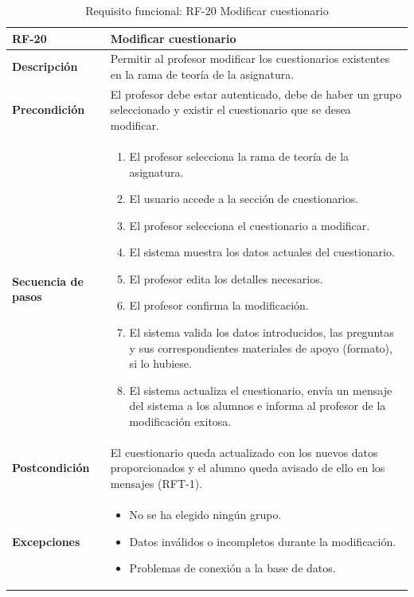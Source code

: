 \begin{table}[H]
\centering
\begin{tabularx}{\textwidth}{
  |>{\centering\arraybackslash}l
  |>{\centering\arraybackslash}X|}
\hline
\textbf{RF-20} & \textbf{Modificar cuestionario} \\ \hline

\textbf{Descripción} & Permitir al profesor modificar los cuestionarios existentes en la rama de teoría de la asignatura. \\ \hline

\textbf{Precondición} & El profesor debe estar autenticado, debe de haber un grupo seleccionado y existir el cuestionario que se desea modificar. \\ \hline

\textbf{Secuencia de pasos} & 
\begin{enumerate}
  \item El profesor selecciona la rama de teoría de la asignatura.
  \item El usuario accede a la sección de cuestionarios.
  \item El profesor selecciona el cuestionario a modificar.
  \item El sistema muestra los datos actuales del cuestionario.
  \item El profesor edita los detalles necesarios.
  \item El profesor confirma la modificación.
  \item El sistema valida los datos introducidos, las preguntas y sus correspondientes materiales de apoyo (formato), si lo hubiese.
  \item El sistema actualiza el cuestionario, envía un mensaje del sistema a los alumnos e informa al profesor de la modificación exitosa.
\end{enumerate} \\ \hline

\textbf{Postcondición} & El cuestionario queda actualizado con los nuevos datos proporcionados y el alumno queda avisado de ello en los mensajes (RFT-1). \\ \hline

\textbf{Excepciones} & 
\begin{itemize}
  \item No se ha elegido ningún grupo.
  \item Datos inválidos o incompletos durante la modificación.
  \item Problemas de conexión a la base de datos.
\end{itemize} \\ \hline
\end{tabularx}
\caption{Requisito funcional: RF-20 Modificar cuestionario}
\end{table}



